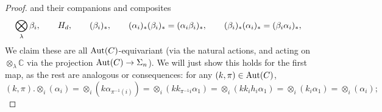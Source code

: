\documentclass[a4paper,10pt
,draft
]{article}%
\renewcommand{\1}{\eta}%
\begin{document}
\begin{proof}
      and their companions and composites
      \[
            \bigotimes_\lambda \beta_i,
            \qquad
            H_d,
            \qquad
            (\beta_i)_{\**},
            \qquad
            (\alpha_i)_{\**} (\beta_i)_{\**} = (\alpha_i \beta_i)_{\**}, %
            \qquad
            (\beta_i)_{\**} (\alpha_i)_{\**} = (\beta_i \alpha_i)_{\**}, %
      \]
      We claim these are all $\operatorname{Aut}(C)$-equivariant
      (via the natural actions, and acting on $\otimes_\lambda \mathbb C$ via the projection $\operatorname{Aut}(C) \to \Sigma_{n}$).
      We will just show this holds for the first map, as the rest are analogous or consequences:
      for any $(k,\pi) \in \operatorname{Aut}(C)$,
      \begin{equation}
            \label{AB_STAR_EQ}
            (k, \pi) . \otimes_i(\alpha_i)
            =
            \otimes_i (k \alpha_{\pi^{-1}(i)})
            =
            \otimes_i (k k_{\pi^{-1}i} \alpha_1)
            =
            \otimes_i (k k_i h_i \alpha_1)
            =
            \otimes_i (k_i \alpha_1)
            =
            \otimes_i (\alpha_i);
      \end{equation}
      

\end{proof}
\end{document}
